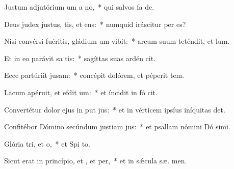 \item Justum adjutórium um a no,~* qui salvos fa  de.
\item Deus judex justus, tis, et ens:~* numquid iráscitur per  es?
\item Nisi convérsi fuéritis, gládium um vibit:~* arcum suum teténdit, et  lum.
\item Et in eo parávit sa tis:~* sagíttas suas ardén cit.
\item Ecce partúriit jusam:~* concépit dolórem, et péperit tem.
\item Lacum apéruit, et efdit um:~* et íncidit in fó  cit.
\item Convertétur dolor ejus in put jus:~* et in vérticem ipsíus iníquitas  det.
\item Confitébor Dómino secúndum justiam jus:~* et psallam nómini Dó simi.
\item Glória tri, et o,~* et Spi to.
\item Sicut erat in princípio, et , et per,~* et in sǽcula sæ. men.
